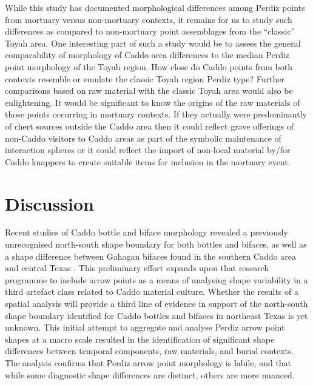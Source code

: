 \documentclass[review]{elsarticle}
\begin{document}
While this study has documented morphological differences among Perdiz points from mortuary versus non-mortuary contexts, it remains for us to study such differences as compared to non-mortuary point assemblages from the “classic” Toyah area.  One interesting part of such a study would be to assess the general comparability of morphology of Caddo area differences to the median Perdiz point morphology of the Toyah region. How close do Caddo points from both contexts resemble or emulate the classic Toyah region Perdiz type? Further comparisons based on raw material with the classic Toyah area would also be enlightening. It would be significant to know the origins of the raw materials of those points occurring in mortuary contexts. If they actually were predominantly of chert sources outside the Caddo area then it could reflect grave offerings of non-Caddo visitors to Caddo areas as part of the symbolic maintenance of interaction spheres or it could reflect the import of non-local material by/for Caddo knappers to create suitable items for inclusion in the mortuary event.

\section*{Discussion}

Recent studies of Caddo bottle and biface morphology revealed a previously unrecognised north-south shape boundary for both bottles and bifaces, as well as a shape difference between Gahagan bifaces found in the southern Caddo area and central Texas \citep{RN7162,RN5693,RN8074,RN7927,RN8158,RN8370,RN8322,RN8312}. This preliminary effort expands upon that research programme to include arrow points as a means of analysing shape variability in a third artefact class related to Caddo material culture. Whether the results of a spatial analysis will provide a third line of evidence in support of the north-south shape boundary identified for Caddo bottles and bifaces in northeast Texas is yet unknown. This initial attempt to aggregate and analyse Perdiz arrow point shapes at a macro scale resulted in the identification of significant shape differences between temporal components, raw materials, and burial contexts. The analysis confirms that Perdiz arrow point morphology is labile, and that while some diagnostic shape differences are distinct, others are more nuanced.
\end{document}
